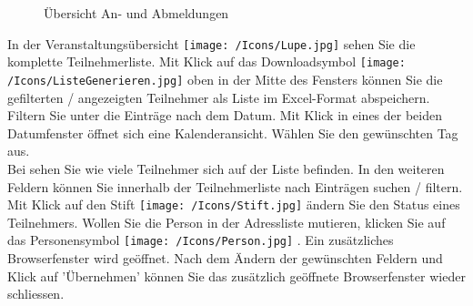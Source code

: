 \begin{figure}[H]
\caption{Übersicht An- und Abmeldungen}
\end{figure}

In der Veranstaltungsübersicht \texttt{[image: /Icons/Lupe.jpg]} sehen Sie die komplette Teilnehmerliste. Mit Klick auf das Downloadsymbol \texttt{[image: /Icons/ListeGenerieren.jpg]} oben in der Mitte des Fensters können Sie die gefilterten / angezeigten Teilnehmer als Liste im Excel-Format abspeichern. Filtern Sie unter  die Einträge nach dem Datum. Mit Klick in eines der beiden Datumfenster öffnet sich eine Kalenderansicht. Wählen Sie den gewünschten Tag aus. \\
Bei  sehen Sie wie viele Teilnehmer sich auf der Liste befinden. In den weiteren Feldern  können Sie innerhalb der Teilnehmerliste nach Einträgen suchen / filtern. Mit Klick auf den Stift \texttt{[image: /Icons/Stift.jpg]}  ändern Sie den Status eines Teilnehmers. Wollen Sie die Person in der Adressliste mutieren, klicken Sie auf das Personensymbol \texttt{[image: /Icons/Person.jpg]} . Ein zusätzliches Browserfenster wird geöffnet. Nach dem Ändern der gewünschten Feldern und Klick auf 'Übernehmen' können Sie das zusätzlich geöffnete Browserfenster wieder schliessen. 

\pagebreak

